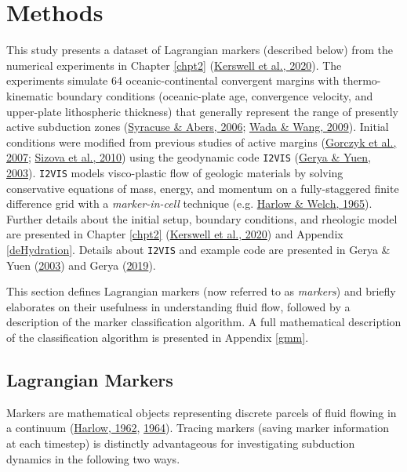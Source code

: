\hypertarget{chpt4Methods}{%
\section{Methods}\label{chpt4Methods}}

This study presents a dataset of Lagrangian markers (described below) from the numerical experiments in Chapter \ref{chpt2} (\protect\hyperlink{ref-kerswell2020}{Kerswell et al., 2020}). The experiments simulate 64 oceanic-continental convergent margins with thermo-kinematic boundary conditions (oceanic-plate age, convergence velocity, and upper-plate lithospheric thickness) that generally represent the range of presently active subduction zones (\protect\hyperlink{ref-syracuse2006}{Syracuse \& Abers, 2006}; \protect\hyperlink{ref-wada2009}{Wada \& Wang, 2009}). Initial conditions were modified from previous studies of active margins (\protect\hyperlink{ref-gorczyk2007}{Gorczyk et al., 2007}; \protect\hyperlink{ref-sizova2010}{Sizova et al., 2010}) using the geodynamic code \texttt{I2VIS} (\protect\hyperlink{ref-gerya2003}{Gerya \& Yuen, 2003}). \texttt{I2VIS} models visco-plastic flow of geologic materials by solving conservative equations of mass, energy, and momentum on a fully-staggered finite difference grid with a \emph{marker-in-cell} technique (e.g. \protect\hyperlink{ref-harlow1965}{Harlow \& Welch, 1965}). Further details about the initial setup, boundary conditions, and rheologic model are presented in Chapter \ref{chpt2} (\protect\hyperlink{ref-kerswell2020}{Kerswell et al., 2020}) and Appendix \ref{deHydration}. Details about \texttt{I2VIS} and example code are presented in Gerya \& Yuen (\protect\hyperlink{ref-gerya2003}{2003}) and Gerya (\protect\hyperlink{ref-gerya2019}{2019}).

This section defines Lagrangian markers (now referred to as \emph{markers}) and briefly elaborates on their usefulness in understanding fluid flow, followed by a description of the marker classification algorithm. A full mathematical description of the classification algorithm is presented in Appendix \ref{gmm}.

\hypertarget{lagrangian-markers}{%
\subsection{Lagrangian Markers}\label{lagrangian-markers}}

Markers are mathematical objects representing discrete parcels of fluid flowing in a continuum (\protect\hyperlink{ref-harlow1962}{Harlow, 1962}, \protect\hyperlink{ref-harlow1964}{1964}). Tracing markers (saving marker information at each timestep) is distinctly advantageous for investigating subduction dynamics in the following two ways.

